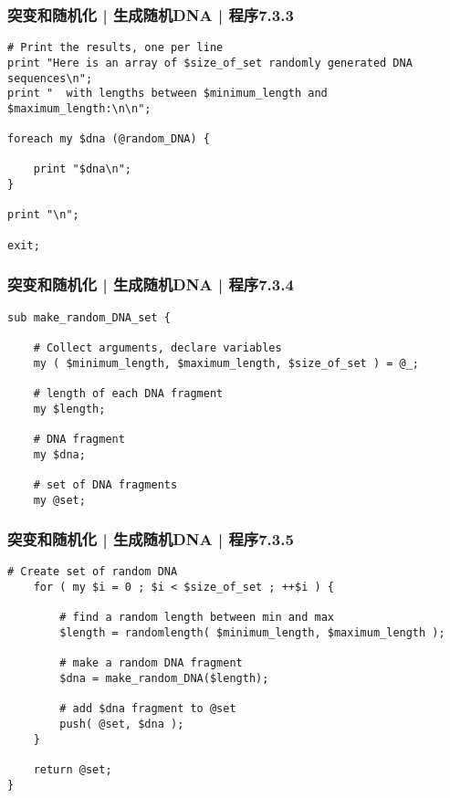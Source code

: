 \begin{frame}[fragile]
  \frametitle{突变和随机化 | 生成随机DNA | 程序7.3.3}
  \vspace{-1.5em}
\begin{lstlisting}[firstnumber=24]
# Print the results, one per line
print "Here is an array of $size_of_set randomly generated DNA sequences\n";
print "  with lengths between $minimum_length and $maximum_length:\n\n";

foreach my $dna (@random_DNA) {

    print "$dna\n";
}

print "\n";

exit;
\end{lstlisting}
\end{frame}

\begin{frame}[fragile]
  \frametitle{突变和随机化 | 生成随机DNA | 程序7.3.4}
  \vspace{-1.5em}
\begin{lstlisting}[firstnumber=51]
sub make_random_DNA_set {

    # Collect arguments, declare variables
    my ( $minimum_length, $maximum_length, $size_of_set ) = @_;

    # length of each DNA fragment
    my $length;

    # DNA fragment
    my $dna;

    # set of DNA fragments
    my @set;
\end{lstlisting}
\end{frame}

\begin{frame}[fragile]
  \frametitle{突变和随机化 | 生成随机DNA | 程序7.3.5}
  \vspace{-1.5em}
\begin{lstlisting}[firstnumber=65,basicstyle=\small\tt]
    # Create set of random DNA
    for ( my $i = 0 ; $i < $size_of_set ; ++$i ) {

        # find a random length between min and max
        $length = randomlength( $minimum_length, $maximum_length );

        # make a random DNA fragment
        $dna = make_random_DNA($length);

        # add $dna fragment to @set
        push( @set, $dna );
    }

    return @set;
}
\end{lstlisting}
\end{frame}

